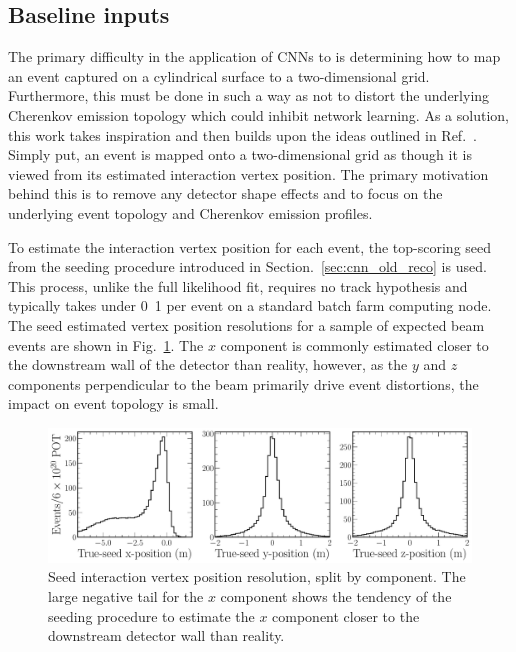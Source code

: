 \subsection{Baseline inputs} %
\label{sec:cnn_baseline_inputs} %

The primary difficulty in the application of CNNs to \chips is determining how to map an event
captured on a cylindrical surface to a two-dimensional grid. Furthermore, this must be done in
such a way as not to distort the underlying Cherenkov emission topology which could inhibit
network learning. As a solution, this work takes inspiration and then builds upon the ideas
outlined in Ref.~\cite{theodore2016}. Simply put, an event is mapped onto a two-dimensional grid
as though it is viewed from its estimated interaction vertex position. The primary motivation
behind this is to remove any detector shape effects and to focus on the underlying event topology
and Cherenkov emission profiles.

To estimate the interaction vertex position for each event, the top-scoring seed from the seeding
procedure introduced in Section.~\ref{sec:cnn_old_reco} is used. This process, unlike the full
likelihood fit, requires no track hypothesis and typically takes under \unit{0.1}{}
per event on a standard batch farm computing node. The seed estimated vertex position resolutions
for a sample of expected beam events are shown in Fig.~\ref{fig:explore_true_reco_vtx}. The $x$
component is commonly estimated closer to the downstream wall of the detector than reality,
however, as the $y$ and $z$ components perpendicular to the beam primarily drive event
distortions, the impact on event topology is small.

\begin{figure} %
    \includegraphics[width=\textwidth]{diagrams/7-results/explore_true_reco_vtx.pdf}
    \caption[Seed interaction vertex resolutions]
    {Seed interaction vertex position resolution, split by component. The large negative tail for
        the $x$ component shows the tendency of the seeding procedure to estimate the $x$
        component closer to the downstream detector wall than reality.}
    \label{fig:explore_true_reco_vtx}
\end{figure}

